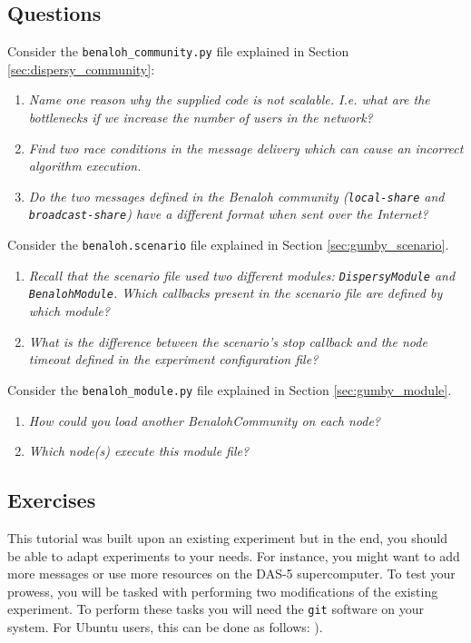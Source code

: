 \documentclass{article}
\begin{document}
\subsection{Questions}
Consider the \texttt{benaloh\_community.py} file explained in Section \ref{sec:dispersy_community}:
\begin{enumerate}
	\item \textit{Name one reason why the supplied code is not scalable. I.e. what are the bottlenecks if we increase the number of users in the network?}
	\item \textit{Find two race conditions in the message delivery which can cause an  incorrect algorithm execution.}
	\item \textit{Do the two messages defined in the Benaloh community (\texttt{local-share} and \texttt{broadcast-share}) have a different format when sent over the Internet?}
\end{enumerate}
Consider the \texttt{benaloh.scenario} file explained in Section \ref{sec:gumby_scenario}.
\begin{enumerate}
\item \textit{Recall that the scenario file used two different modules: \texttt{DispersyModule} and \texttt{BenalohModule}. Which callbacks present in the scenario file are defined by which module?}
\item \textit{What is the difference between the scenario's \emph{stop} callback and the node timeout defined in the experiment configuration file?}
\end{enumerate}
Consider the \texttt{benaloh\_module.py} file explained in Section \ref{sec:gumby_module}.
\begin{enumerate}
\item \textit{How could you load another BenalohCommunity on each node?}
\item \textit{Which node(s) execute this module file?}
\end{enumerate}

\subsection{Exercises}

This tutorial was built upon an existing experiment but in the end, you should be able to adapt experiments to your needs.
For instance, you might want to add more messages or use more resources on the DAS-5 supercomputer.
To test your prowess, you will be tasked with performing two modifications of the existing experiment.
To perform these tasks you will need the \texttt{git} software on your system.
For Ubuntu users, this can be done as follows: ).
\end{document}
